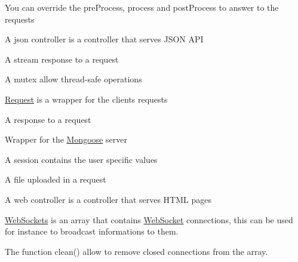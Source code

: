 You can override the pre\+Process, process and post\+Process to answer to the requests

A json controller is a controller that serves J\+S\+ON A\+PI

A stream response to a request

A mutex allow thread-\/safe operations

\hyperlink{classMongoose_1_1Request}{Request} is a wrapper for the clients requests

A response to a request

Wrapper for the \hyperlink{namespaceMongoose}{Mongoose} server

A session contains the user specific values

A file uploaded in a request

A web controller is a controller that serves H\+T\+ML pages

\hyperlink{classMongoose_1_1WebSockets}{Web\+Sockets} is an array that contains \hyperlink{classMongoose_1_1WebSocket}{Web\+Socket} connections, this can be used for instance to broadcast informations to them.

The function clean() allow to remove closed connections from the array. 